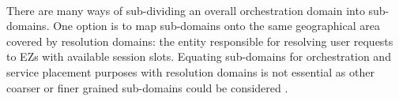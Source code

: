 \paragraph{}There are many ways of sub-dividing an overall orchestration domain into sub-domains. One option is to map sub-domains onto the same geographical area covered by resolution domains: the entity responsible for resolving user requests to EZs with available session slots. Equating sub-domains for orchestration and service placement purposes with resolution domains is not essential as other coarser or finer grained sub-domains could be considered
 \cite{maini_hierarchical_2016}.
